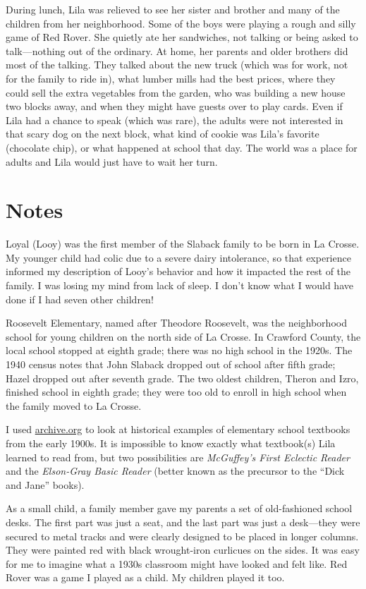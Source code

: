 \documentclass[
  letterpaper,
]{book}
\begin{document}
During lunch, Lila was relieved to see her sister and brother and many
of the children from her neighborhood. Some of the boys were playing a
rough and silly game of Red Rover. She quietly ate her sandwiches, not
talking or being asked to talk---nothing out of the ordinary. At home,
her parents and older brothers did most of the talking. They talked
about the new truck (which was for work, not for the family to ride in),
what lumber mills had the best prices, where they could sell the extra
vegetables from the garden, who was building a new house two blocks
away, and when they might have guests over to play cards. Even if Lila
had a chance to speak (which was rare), the adults were not interested
in that scary dog on the next block, what kind of cookie was Lila's
favorite (chocolate chip), or what happened at school that day. The
world was a place for adults and Lila would just have to wait her turn.

\section{Notes}\label{notes-5}

Loyal (Looy) was the first member of the Slaback family to be born in La
Crosse. My younger child had colic due to a severe dairy intolerance, so
that experience informed my description of Looy's behavior and how it
impacted the rest of the family. I was losing my mind from lack of
sleep. I don't know what I would have done if I had seven other
children!

Roosevelt Elementary, named after Theodore Roosevelt, was the
neighborhood school for young children on the north side of La Crosse.
In Crawford County, the local school stopped at eighth grade; there was
no high school in the 1920s. The 1940 census notes that John Slaback
dropped out of school after fifth grade; Hazel dropped out after seventh
grade. The two oldest children, Theron and Izro, finished school in
eighth grade; they were too old to enroll in high school when the family
moved to La Crosse.

I used \href{https://archive.org/}{archive.org} to look at historical
examples of elementary school textbooks from the early 1900s. It is
impossible to know exactly what textbook(s) Lila learned to read from,
but two possibilities are \emph{McGuffey's First Eclectic Reader} and
the \emph{Elson-Gray Basic Reader} (better known as the precursor to the
``Dick and Jane'' books).

As a small child, a family member gave my parents a set of old-fashioned
school desks. The first part was just a seat, and the last part was just
a desk---they were secured to metal tracks and were clearly designed to
be placed in longer columns. They were painted red with black
wrought-iron curlicues on the sides. It was easy for me to imagine what
a 1930s classroom might have looked and felt like. Red Rover was a game
I played as a child. My children played it too.
\end{document}

